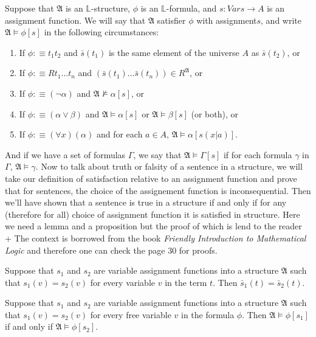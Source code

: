 \documentclass[9pt,a4paper, twocolumn]{article}
\newcommand{\curveL}{\mathbb{L} }
\newcommand{\curveA}{\mathfrak{A} }
\begin{document}
            \begin{define}
                Suppose that $\curveA$ is an $\curveL$-structure, $\phi$ is an $\curveL$-formula, and $s: Vars\rightarrow A$ is an assignment function. We will say that $\curveA$ satisfier $\phi$ with assignment$s$, and write $\curveA \vDash \phi[s]$ in the following circumstances:
                \begin{enumerate}
                    \item If $\phi:\equiv t_1t_2$ and $\bar s(t_1)$ is the same element of the universe $A$ as $\bar s(t_2)$, or
                    \item If $\phi:\equiv Rt_1\dots t_n$ and $(\bar s(t_1) \dots \bar s(t_n)) \in R^\curveA$, or
                    \item If $\phi:\equiv (\neg\alpha)$ and $\curveA\not\vDash \alpha[s]$, or
                    \item If $\phi:\equiv (\alpha\lor\beta)$ and $\curveA\vDash\alpha[s]$ or $\curveA\vDash\beta[s]$ (or both), or
                    \item If $\phi:\equiv (\forall x)(\alpha)$ and for each $a\in A$, $\curveA\vDash \alpha[s(x|a)]$.
                \end{enumerate}
            \end{define}
            And if we have a set of formulas $\Gamma$, we say that $\curveA\vDash \Gamma[s]$ if for each formula $\gamma$ in $\Gamma$, $\curveA\vDash\gamma$. Now to talk about truth or falsity of a sentence in a structure, we will take our definition of satisfaction relative to an assignment function and prove that for sentences, the choice of the assignement function is inconsequential. Then we'll have shown that a sentence is true in a structure if and only if for any (therefore for all) choice of assignment function it is satisfied in structure. Here we need a lemma and a proposition but the proof of which is lend to the reader + The context is borrowed from the book \textit{Friendly Introduction to Mathematical Logic} and therefore one can check the page 30 for proofs.
            \begin{lemma}
                Suppose that $s_1$ and $s_2$ are variable assignment functions into a structure $\curveA$ such that $s_1(v)= s_2(v)$ for every variable $v$ in the term $t$. Then $\bar s_1(t) = \bar s_2(t)$.
            \end{lemma} 
            \begin{proposition}
                Suppose that $s_1$ and $s_2$ are variable assignment functions into a structure $\curveA$ such that $s_1(v)= s_2(v)$ for every free variable $v$ in the formula $\phi$. Then $\curveA\vDash \phi[s_1]$ if and only if $\curveA\vDash \phi[s_2]$.
            \end{proposition}
\end{document}
